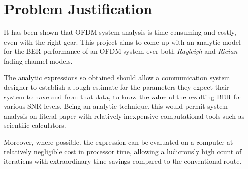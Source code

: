 \section{Problem Justification}
It has been shown that \gls{OFDM} system analysis is time consuming and costly, even with the right gear. This project aims to come up with an analytic model for the \gls{BER} performance of an \gls{OFDM} system over both \emph{Rayleigh} and \emph{Rician} fading channel models.

The analytic expressions so obtained should allow a communication system designer to establish a rough estimate for the parameters they expect their system to have and from that data, to know the value of the resulting BER for various \gls{SNR} levels. Being an analytic technique, this would permit system analysis on literal paper with relatively inexpensive computational tools such as scientific calculators.

Moreover, where possible, the expression can be evaluated on a computer at relatively negligible cost in processor time, allowing a ludicrously high count of iterations with extraordinary time savings compared to the conventional route.

